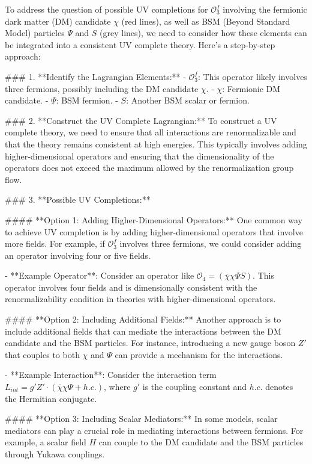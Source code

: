 To address the question of possible UV completions for \(\mathcal{O}_3^f\) involving the fermionic dark matter (DM) candidate \(\chi\) (red lines), as well as BSM (Beyond Standard Model) particles \(\Psi\) and \(S\) (grey lines), we need to consider how these elements can be integrated into a consistent UV complete theory. Here's a step-by-step approach:

### 1. **Identify the Lagrangian Elements:**
   - \(\mathcal{O}_3^f\): This operator likely involves three fermions, possibly including the DM candidate \(\chi\).
   - \(\chi\): Fermionic DM candidate.
   - \(\Psi\): BSM fermion.
   - \(S\): Another BSM scalar or fermion.

### 2. **Construct the UV Complete Lagrangian:**
   To construct a UV complete theory, we need to ensure that all interactions are renormalizable and that the theory remains consistent at high energies. This typically involves adding higher-dimensional operators and ensuring that the dimensionality of the operators does not exceed the maximum allowed by the renormalization group flow.

### 3. **Possible UV Completions:**

#### **Option 1: Adding Higher-Dimensional Operators:**
One common way to achieve UV completion is by adding higher-dimensional operators that involve more fields. For example, if \(\mathcal{O}_3^f\) involves three fermions, we could consider adding an operator involving four or five fields.

- **Example Operator**: Consider an operator like \(\mathcal{O}_4 = (\bar{\chi} \chi \Psi S)\). This operator involves four fields and is dimensionally consistent with the renormalizability condition in theories with higher-dimensional operators.

#### **Option 2: Including Additional Fields:**
Another approach is to include additional fields that can mediate the interactions between the DM candidate and the BSM particles. For instance, introducing a new gauge boson \(Z'\) that couples to both \(\chi\) and \(\Psi\) can provide a mechanism for the interactions.

- **Example Interaction**: Consider the interaction term \(L_{int} = g' Z' \cdot (\bar{\chi} \chi \Psi + h.c.)\), where \(g'\) is the coupling constant and \(h.c.\) denotes the Hermitian conjugate.

#### **Option 3: Including Scalar Mediators:**
In some models, scalar mediators can play a crucial role in mediating interactions between fermions. For example, a scalar field \(H\) can couple to the DM candidate and the BSM particles through Yukawa couplings.

